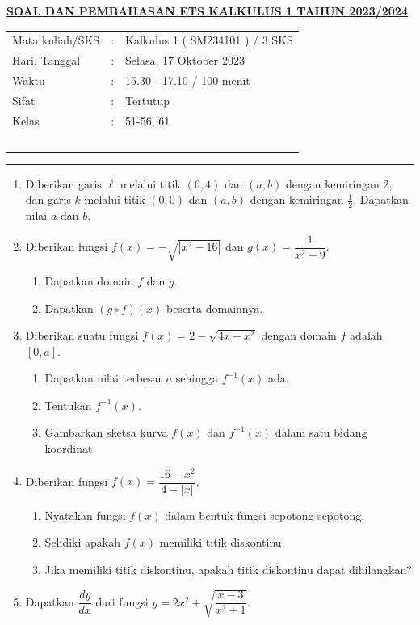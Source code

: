 \documentclass[10pt,openany,a4paper]{article}
\theoremstyle{definition}
\theoremstyle{definition}
\theoremstyle{plain}
\begin{document}
\newpage
 \begin{center}
	{\underline{\textbf{\MakeUppercase{Soal dan Pembahasan ETS Kalkulus 1 Tahun 2023/2024}}}}
    \end{center}

    \begin{center}
	\begin{tabular}{lcl}
		Mata kuliah/SKS & : & Kalkulus 1 ( SM234101 ) / 3 SKS\\
		Hari, Tanggal & : & Selasa, 17 Oktober 2023\\
		Waktu & : & 15.30 - 17.10 / 100 menit\\
		Sifat & : & Tertutup\\
		Kelas & : & 51-56, 61\\
  ~
	\end{tabular}

    \noindent\rule{\textwidth}{2.pt}
        \end{center}
    \begin{enumerate}
    \item Diberikan garis $\ell$ melalui titik $(6,4)$ dan $(a,b)$ dengan kemiringan $2$, dan garis $k$ melalui titik $(0,0)$ dan $(a,b)$ dengan kemiringan $\frac{1}{2}$. Dapatkan nilai $a$ dan $b$.

    \item Diberikan fungsi $f(x)=-\sqrt{|x^2-16|}$ dan $g(x)=\dfrac{1}{x^2-9}$.
    \begin{enumerate}
        \item Dapatkan domain $f$ dan $g$.
        \item Dapatkan $(g\circ f)(x)$ beserta domainnya.
    \end{enumerate}

    \item Diberikan suatu fungsi $f(x)=2-\sqrt{4x-x^2}$ dengan domain $f$ adalah $[0,a]$.
    \begin{enumerate}
        \item Dapatkan nilai terbesar $a$ sehingga $f^{-1}(x)$ ada.
        \item Tentukan $f^{-1}(x)$.
        \item Gambarkan sketsa kurva $f(x)$ dan $f^{-1}(x)$ dalam satu bidang koordinat.
    \end{enumerate}

    \item Diberikan fungsi $f(x)=\dfrac{16-x^2}{4-|x|}$.
    \begin{enumerate}
        \item Nyatakan fungsi $f(x)$ dalam bentuk fungsi sepotong-sepotong.
        \item Selidiki apakah $f(x)$ memiliki titik diskontinu.
        \item Jika memiliki titik diskontinu, apakah titik diskontinu dapat dihilangkan?
    \end{enumerate}

    \item Dapatkan $\dfrac{dy}{dx}$ dari fungsi $y=2x^2+\sqrt{\dfrac{x-3}{x^2+1}}$.
\end{enumerate}
\end{document}
